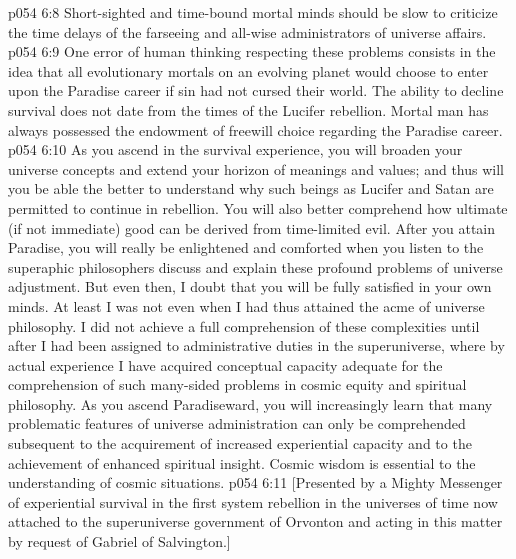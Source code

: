 \vs p054 6:8 Short\hyp{}sighted and time\hyp{}bound mortal minds should be slow to criticize the time delays of the farseeing and all\hyp{}wise administrators of universe affairs.
\vs p054 6:9 One error of human thinking respecting these problems consists in the idea that all evolutionary mortals on an evolving planet would choose to enter upon the Paradise career if sin had not cursed their world. The ability to decline survival does not date from the times of the Lucifer rebellion. Mortal man has always possessed the endowment of freewill choice regarding the Paradise career.
\vs p054 6:10 \pc As you ascend in the survival experience, you will broaden your universe concepts and extend your horizon of meanings and values; and thus will you be able the better to understand why such beings as Lucifer and Satan are permitted to continue in rebellion. You will also better comprehend how ultimate (if not immediate) good can be derived from time\hyp{}limited evil. After you attain Paradise, you will really be enlightened and comforted when you listen to the superaphic philosophers discuss and explain these profound problems of universe adjustment. But even then, I doubt that you will be fully satisfied in your own minds. At least I was not even when I had thus attained the acme of universe philosophy. I did not achieve a full comprehension of these complexities until after I had been assigned to administrative duties in the superuniverse, where by actual experience I have acquired conceptual capacity adequate for the comprehension of such many\hyp{}sided problems in cosmic equity and spiritual philosophy. As you ascend Paradiseward, you will increasingly learn that many problematic features of universe administration can only be comprehended subsequent to the acquirement of increased experiential capacity and to the achievement of enhanced spiritual insight. Cosmic wisdom is essential to the understanding of cosmic situations.
\vsetoff
\vs p054 6:11 [Presented by a Mighty Messenger of experiential survival in the first system rebellion in the universes of time now attached to the superuniverse government of Orvonton and acting in this matter by request of Gabriel of Salvington.]
\quizlink
